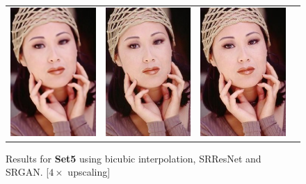 \documentclass[10pt,twocolumn,letterpaper]{article}
\begin{document}
\begin{figure}[h!]
\begin{tabular}{cccc}
     	\includegraphics[width=1.4in]{images/used/appendix/jpg/Set5/woman_SRResNet-MSE} &
     	\includegraphics[width=1.4in]{images/used/appendix/jpg/Set5/woman_SRGAN-VGG54} &
     	\includegraphics[width=1.4in]{images/used/appendix/jpg/Set5/woman_HR} \\
  	\end{tabular}
  	\label{fig:app_Set5}
  	\caption{Results for \textbf{Set5} using bicubic interpolation, SRResNet and SRGAN. [$4\times$ upscaling]} 
\end{figure}

\clearpage
\end{document}
